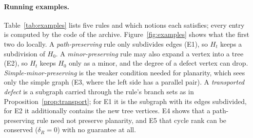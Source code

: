 \documentclass[10pt]{article}
\theoremstyle{definition}
\theoremstyle{plain}
\theoremstyle{remark}
\begin{document}
\paragraph{Running examples.} Table~\ref{tab:examples} lists five rules and which notions each satisfies; every entry is computed by the code of the archive. Figure~\ref{fig:examples} shows what the first two do locally. A \emph{path-preserving} rule only subdivides edges (E1), so $H_t$ keeps a subdivision of $H_0$. A \emph{minor-preserving} rule may also expand a vertex into a tree (E2), so $H_t$ keeps $H_0$ only as a minor, and the degree of a defect vertex can drop. \emph{Simple-minor-preserving} is the weaker condition needed for planarity, which sees only the simple graph (E3, where the left side has a parallel pair). A \emph{transported defect} is a subgraph carried through the rule's branch sets as in Proposition~\ref{prop:transport}; for E1 it is the subgraph with its edges subdivided, for E2 it additionally contains the new tree vertices. E4 shows that a path-preserving rule need not preserve planarity, and E5 that cycle rank can be conserved ($\delta_R=0$) with no guarantee at all.
\begin{table}[t]\centering\scriptsize
\resizebox{\textwidth}{!}{}
\caption{Running examples. ``path'', ``minor'', ``simple-minor'': the three preservation notions of Definition~\ref{def:minor}; ``planarity-pres.'': condition $P$ of Section~\ref{sec:planarity}, equivalent to planarity preservation on $\mathcal S$; ``guaranteed in $H_t$'': the strongest relation to $H_0$ that the theorems give.}\label{tab:examples}
\end{table}
\end{document}
